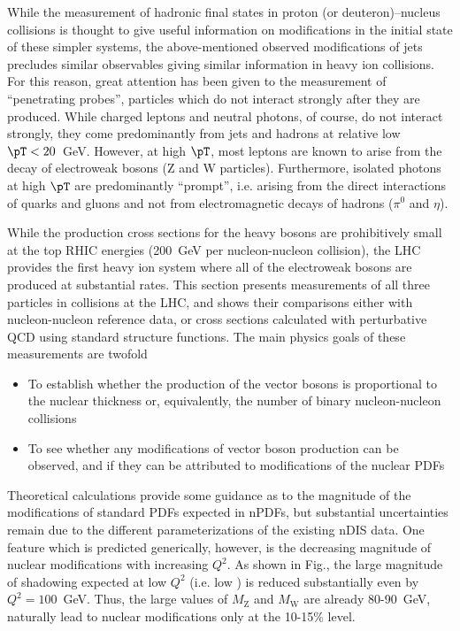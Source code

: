 While the measurement of hadronic final states in proton (or deuteron)--nucleus collisions
is thought to give useful information on modifications in the initial state of these
simpler systems, the above-mentioned observed modifications of jets precludes similar
observables giving similar information in heavy ion collisions.
For this reason, great attention has been given to the measurement of
``penetrating probes'', particles which do not interact strongly after they are produced.
While charged leptons and neutral photons, of course,
do not interact strongly, they come predominantly from
jets and hadrons at relative low $\pT < 20$~GeV.
However, at high $\pT$, most leptons are known to arise from the decay of electroweak
bosons (Z and W particles).  Furthermore, isolated photons at high $\pT$ are predominantly
``prompt'', i.e. arising from the direct interactions of quarks and gluons and not from
electromagnetic decays of hadrons ($\pi^0$ and $\eta$).

While the production cross sections for the heavy bosons are prohibitively small at the
top RHIC energies (200~GeV per nucleon-nucleon collision), the LHC provides the first
heavy ion system where all of the electroweak bosons are produced at substantial rates.
This section presents measurements of all three particles in \PbPb collisions at the LHC,
and shows their comparisons either with nucleon-nucleon reference data, or cross sections
calculated with perturbative QCD using standard structure functions.
The main physics goals of these measurements are twofold
\begin{itemize}
\item To establish whether the production of the vector bosons is proportional to the
nuclear thickness or, equivalently, the number of binary nucleon-nucleon collisions
\item To see whether any modifications of vector boson production can be observed,
and if they can be attributed to modifications of the nuclear PDFs
\end{itemize}
Theoretical calculations provide some guidance as to the magnitude of the modifications
of standard PDFs expected in nPDFs, but substantial uncertainties remain due to the
different parameterizations of the existing nDIS data.
One feature which is predicted generically, however, is the decreasing magnitude of
nuclear modifications with increasing $Q^2$.  As shown in Fig., the large magnitude
of shadowing expected at low $Q^2$ (i.e. low \pT) is reduced substantially even by
$Q^2=100$~GeV.  Thus, the large values of $M_{\mathrm Z}$ and $M_{\mathrm W}$ are already 80-90~GeV, naturally lead
to nuclear modifications only at the 10-15\% level.

